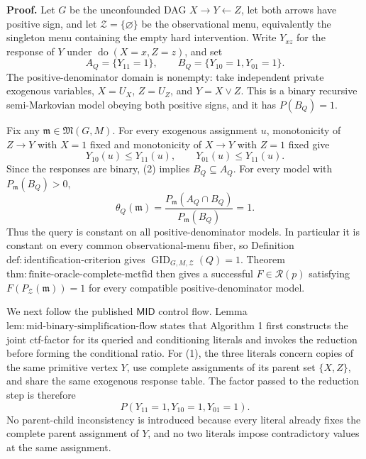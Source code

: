 \textbf{Proof.}
Let \(G\) be the unconfounded DAG \(X\to Y\leftarrow Z\), let both arrows have positive sign, and let \(\mathcal Z=\{\varnothing\}\) be the observational menu, equivalently the singleton menu containing the empty hard intervention.  Write \(Y_{xz}\) for the response of \(Y\) under \(\operatorname{do}(X=x,Z=z)\), and set
\[
 A_Q=\{Y_{11}=1\},
 \qquad
 B_Q=\{Y_{10}=1,Y_{01}=1\}.
\tag{1}
\]
The positive-denominator domain is nonempty: take independent private exogenous variables, \(X=U_X\), \(Z=U_Z\), and \(Y=X\lor Z\).  This is a binary recursive semi-Markovian model obeying both positive signs, and it has \(P(B_Q)=1\).

Fix any \(\mathfrak m\in\mathfrak M(G,M)\).  For every exogenous assignment \(u\), monotonicity of \(Z\to Y\) with \(X=1\) fixed and monotonicity of \(X\to Y\) with \(Z=1\) fixed give
\[
 Y_{10}(u)\le Y_{11}(u),
 \qquad
 Y_{01}(u)\le Y_{11}(u).
\tag{2}
\]
Since the responses are binary, (2) implies \(B_Q\subseteq A_Q\).  For every model with \(P_{\mathfrak m}(B_Q)>0\),
\[
 \theta_Q(\mathfrak m)
 =\frac{P_{\mathfrak m}(A_Q\cap B_Q)}{P_{\mathfrak m}(B_Q)}
 =1.
\tag{3}
\]
Thus the query is constant on all positive-denominator models.  In particular it is constant on every common observational-menu fiber, so Definition \(\mathrm{def:identification\text{-}criterion}\) gives \(\operatorname{GID}_{G,M,\mathcal Z}(Q)=1\).  Theorem \(\mathrm{thm:finite\text{-}oracle\text{-}complete\text{-}mctfid}\) then gives a successful \(F\in\mathcal R(p)\) satisfying \(F(P_{\mathcal Z}(\mathfrak m))=1\) for every compatible positive-denominator model.

We next follow the published \(\mathsf{MID}\) control flow.  Lemma \(\mathrm{lem:mid\text{-}binary\text{-}simplification\text{-}flow}\) states that Algorithm 1 first constructs the joint ctf-factor for its queried and conditioning literals and invokes the reduction before forming the conditional ratio.  For (1), the three literals concern copies of the same primitive vertex \(Y\), use complete assignments of its parent set \(\{X,Z\}\), and share the same exogenous response table.  The factor passed to the reduction step is therefore
\[
 P(Y_{11}=1,Y_{10}=1,Y_{01}=1).
\tag{4}
\]
No parent-child inconsistency is introduced because every literal already fixes the complete parent assignment of \(Y\), and no two literals impose contradictory values at the same assignment.

